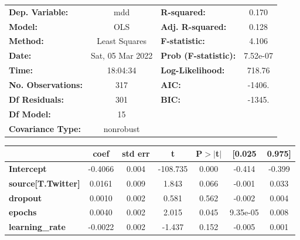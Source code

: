 \begin{center}
\begin{tabular}{lclc}
\toprule
\textbf{Dep. Variable:}              &       mdd        & \textbf{  R-squared:         } &     0.170   \\
\textbf{Model:}                      &       OLS        & \textbf{  Adj. R-squared:    } &     0.128   \\
\textbf{Method:}                     &  Least Squares   & \textbf{  F-statistic:       } &     4.106   \\
\textbf{Date:}                       & Sat, 05 Mar 2022 & \textbf{  Prob (F-statistic):} &  7.52e-07   \\
\textbf{Time:}                       &     18:04:34     & \textbf{  Log-Likelihood:    } &    718.76   \\
\textbf{No. Observations:}           &         317      & \textbf{  AIC:               } &    -1406.   \\
\textbf{Df Residuals:}               &         301      & \textbf{  BIC:               } &    -1345.   \\
\textbf{Df Model:}                   &          15      & \textbf{                     } &             \\
\textbf{Covariance Type:}            &    nonrobust     & \textbf{                     } &             \\
\bottomrule
\end{tabular}
\begin{tabular}{lcccccc}
                                     & \textbf{coef} & \textbf{std err} & \textbf{t} & \textbf{P$> |$t$|$} & \textbf{[0.025} & \textbf{0.975]}  \\
\midrule
\textbf{Intercept}                   &      -0.4066  &        0.004     &  -108.735  &         0.000        &       -0.414    &       -0.399     \\
\textbf{source[T.Twitter]}           &       0.0161  &        0.009     &     1.843  &         0.066        &       -0.001    &        0.033     \\
\textbf{dropout}                     &       0.0010  &        0.002     &     0.581  &         0.562        &       -0.002    &        0.004     \\
\textbf{epochs}                      &       0.0040  &        0.002     &     2.015  &         0.045        &     9.35e-05    &        0.008     \\
\textbf{learning\_rate}              &      -0.0022  &        0.002     &    -1.437  &         0.152        &       -0.005    &        0.001     \\

\end{tabular}
\end{center}
